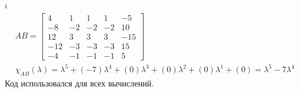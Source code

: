 \i
\begin{gather*}
    AB = \begin{bmatrix}
            4 & 1 & 1 & 1 & -5\\
            -8 & -2 & -2 & -2 & 10\\
            12 & 3 & 3 & 3 & -15\\
            -12 & -3 & -3 & -3 & 15\\
            -4 & -1 & -1 & -1 & 5
         \end{bmatrix}\\
    \chi_{AB}(\lambda) = \lambda^{5} + (-7)\lambda^4 + (0)\lambda^3 + (0)\lambda^2 + (0)\lambda^1 + (0) = \lambda^{5} -7\lambda^4
\end{gather*}
Код использовался для всех вычислений.